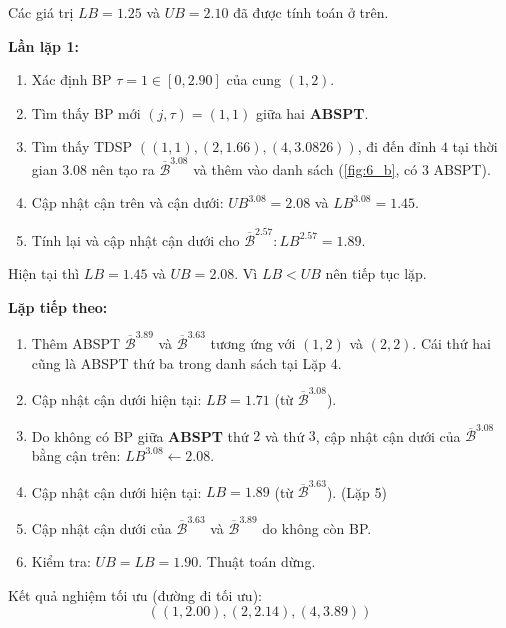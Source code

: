\documentclass[../main.tex]{subfiles}
\begin{document}
Các giá trị \(LB=1.25\) và \(UB=2.10\) đã được tính toán ở trên.

\textbf{Lần lặp 1:}

\begin{enumerate}
\def\labelenumi{\arabic{enumi}.}
\tightlist
\item
  Xác định BP \(\tau = 1 \in [0, 2.90]\) của cung \((1, 2)\).
\item
  Tìm thấy BP mới \((j, \tau) = (1, 1)\) giữa hai \textbf{ABSPT}.
\item
  Tìm thấy TDSP \(((1, 1), (2, 1.66), (4, 3.0826))\), đi đến đỉnh \(4\)
  tại thời gian \(3.08\) nên tạo ra \(\overline{\mathcal B}^{3.08}\) và thêm
  vào danh sách (\autoref{fig:6_b}, có 3 ABSPT).
\item
  Cập nhật cận trên và cận dưới: \(UB^{3.08} = 2.08\) và
  \(LB^{3.08} = 1.45\).
\item
  Tính lại và cập nhật cận dưới cho
  \(\overline{\mathcal B}^{2.57} : LB^{2.57} = 1.89.\)
\end{enumerate}

Hiện tại thì \(LB=1.45\) và \(UB = 2.08\). Vì \(LB<UB\) nên tiếp tục
lặp.

\textbf{Lặp tiếp theo:}

\begin{enumerate}
\def\labelenumi{\arabic{enumi}.}
\tightlist
\item
  Thêm ABSPT \(\overline{\mathcal B}^{3.89}\) và
  \(\overline{\mathcal B}^{3.63}\) tương ứng với \((1, 2)\) và \((2, 2)\).
  Cái thứ hai cũng là ABSPT thứ ba trong danh sách tại Lặp 4.
\item
  Cập nhật cận dưới hiện tại: \(LB = 1.71\) (từ
  \(\overline{\mathcal B}^{3.08}\)).
\item
  Do không có BP giữa \textbf{ABSPT} thứ \(2\) và thứ \(3\), cập
  nhật cận dưới của \(\overline{\mathcal B}^{3.08}\) bằng cận trên:
  \(LB^{3.08} \gets 2.08\).
\item
  Cập nhật cận dưới hiện tại: \(LB = 1.89\) (từ
  \(\overline{\mathcal B}^{3.63}\)). (Lặp 5)
\item
  Cập nhật cận dưới của \(\overline{\mathcal B}^{3.63}\) và
  \(\overline{\mathcal B}^{3.89}\) do không còn BP.
\item
  Kiểm tra: \(UB = LB = 1.90\). Thuật toán dừng.
\end{enumerate}

Kết quả nghiệm tối ưu (đường đi tối ưu):
\[((1, 2.00), (2, 2.14), (4, 3.89))\]
\backmatter
\end{document}
